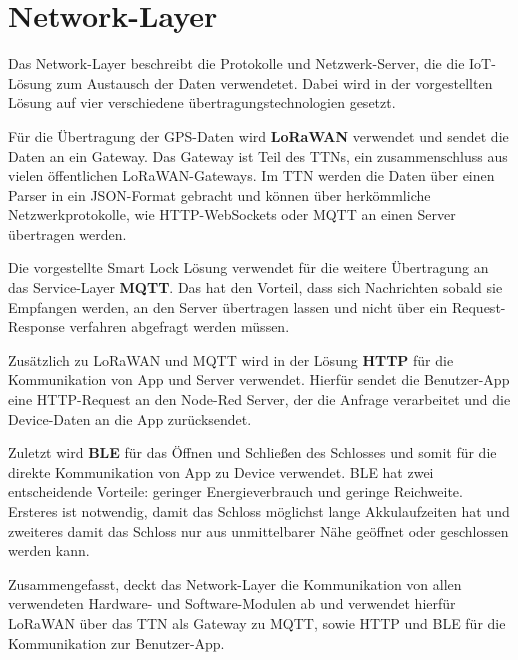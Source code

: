 
\section{Network-Layer} \label{network}
Das Network-Layer beschreibt die Protokolle und Netzwerk-Server, die die \ac{IoT}-Lösung zum Austausch der Daten verwendetet. Dabei wird in der vorgestellten Lösung auf vier verschiedene übertragungstechnologien gesetzt.

Für die Übertragung der \ac{GPS}-Daten wird \textbf{\ac{LoRaWAN}} verwendet und sendet die Daten an ein Gateway. Das Gateway ist Teil des \ac{TTN}s, ein zusammenschluss aus vielen öffentlichen \ac{LoRaWAN}-Gateways. Im \ac{TTN} werden die Daten über einen Parser in ein \ac{JSON}-Format gebracht und können über herkömmliche Netzwerkprotokolle, wie \ac{HTTP}-WebSockets oder \ac{MQTT} an einen Server übertragen werden.

Die vorgestellte Smart Lock Lösung verwendet für die weitere Übertragung an das Service-Layer \textbf{\ac{MQTT}}. Das hat den Vorteil, dass sich Nachrichten sobald sie Empfangen werden, an den Server übertragen lassen und nicht über ein Request-Response verfahren abgefragt werden müssen. 

Zusätzlich zu \ac{LoRaWAN} und \ac{MQTT} wird in der Lösung \textbf{\ac{HTTP}} für die Kommunikation von App und Server verwendet. Hierfür sendet die Benutzer-App eine \ac{HTTP}-Request an den Node-Red Server, der die Anfrage verarbeitet und die Device-Daten an die App zurücksendet. 

Zuletzt wird \textbf{\ac{BLE}} für das Öffnen und Schließen des Schlosses und somit für die direkte Kommunikation von App zu Device verwendet. \ac{BLE} hat zwei entscheidende Vorteile: geringer Energieverbrauch und geringe Reichweite. Ersteres ist notwendig, damit das Schloss möglichst lange Akkulaufzeiten hat und zweiteres damit das Schloss nur aus unmittelbarer Nähe geöffnet oder geschlossen werden kann.

Zusammengefasst, deckt das Network-Layer die Kommunikation von allen verwendeten Hardware- und Software-Modulen ab und verwendet hierfür \ac{LoRaWAN} über das \ac{TTN} als Gateway zu \ac{MQTT}, sowie \ac{HTTP} und \ac{BLE} für die Kommunikation zur Benutzer-App.